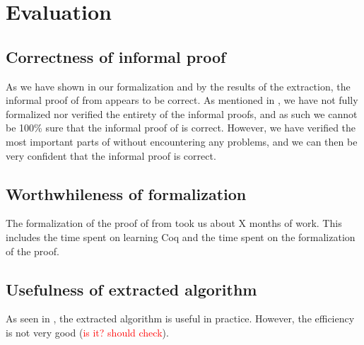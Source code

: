 \chapter{Evaluation}

\section{Correctness of informal proof}

As we have shown in our formalization and by the results of the
extraction, the informal proof of  from \cite{mbezem} appears to be correct.
As mentioned in , we have not fully formalized nor verified the entirety of the informal proofs,
and as such we cannot be 100\% sure that the informal proof of  is correct.
However, we have verified the most important parts of  without
encountering any problems, and we can then be very confident that the informal proof is correct.

\section{Worthwhileness of formalization}

The formalization of the proof of  from \cite{mbezem} took us about X months of work.
This includes the time spent on learning Coq and the time spent on the formalization of the proof.

\section{Usefulness of extracted algorithm}

As seen in , the extracted algorithm is useful in practice.
However, the efficiency is not very good (\textcolor{red}{is it? should check}).
